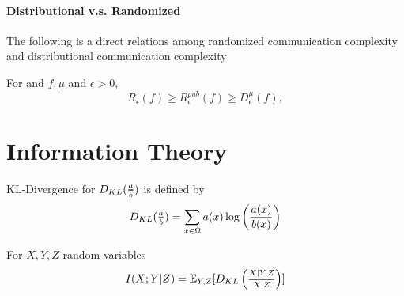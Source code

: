 \paragraph{Distributional v.s. Randomized}
The following is a direct relations among randomized communication complexity and distributional communication complexity
\begin{theorem}
For and $f, \mu$ and $\epsilon > 0$,
\begin{equation*}
	R_{\epsilon}(f)\geq R^{pub}_{\epsilon}(f)\geq D^{\mu}_{\epsilon}(f),
\end{equation*}
\end{theorem}


\section{Information Theory}
\begin{definition}
KL-Divergence for $D_{KL}(\Dfrac{a}{b})$ is defined by
\begin{equation*} 
    D_{KL}(\Dfrac{a}{b}) = \sum_{x \in \Omega} a(x)\log \left(\frac{a(x)}{b(x)}\right)
\end{equation*}

\begin{lemma}
    For $X, Y, Z$ random variables
    \begin{equation*}
        I(X;Y|Z) = \mathbb{E}_{Y,Z}[D_{KL}\left(\Dfrac{X|Y,Z}{X|Z}\right)]
    \end{equation*}
\end{lemma}

\end{definition}